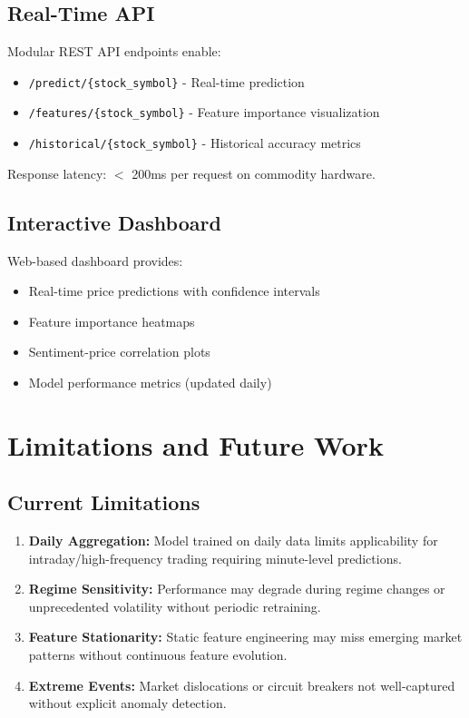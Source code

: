 \documentclass[conference]{IEEEtran}
\begin{document}
\subsection{Real-Time API}

Modular REST API endpoints enable:

\begin{itemize}
\item \texttt{/predict/\{stock\_symbol\}} - Real-time prediction
\item \texttt{/features/\{stock\_symbol\}} - Feature importance visualization
\item \texttt{/historical/\{stock\_symbol\}} - Historical accuracy metrics
\end{itemize}

Response latency: $<$ 200ms per request on commodity hardware.

\subsection{Interactive Dashboard}

Web-based dashboard provides:
\begin{itemize}
\item Real-time price predictions with confidence intervals
\item Feature importance heatmaps
\item Sentiment-price correlation plots
\item Model performance metrics (updated daily)
\end{itemize}

\section{Limitations and Future Work}

\subsection{Current Limitations}

\begin{enumerate}
\item \textbf{Daily Aggregation:} Model trained on daily data limits applicability for intraday/high-frequency trading requiring minute-level predictions.

\item \textbf{Regime Sensitivity:} Performance may degrade during regime changes or unprecedented volatility without periodic retraining.

\item \textbf{Feature Stationarity:} Static feature engineering may miss emerging market patterns without continuous feature evolution.

\item \textbf{Extreme Events:} Market dislocations or circuit breakers not well-captured without explicit anomaly detection.
\end{enumerate}
\end{document}
